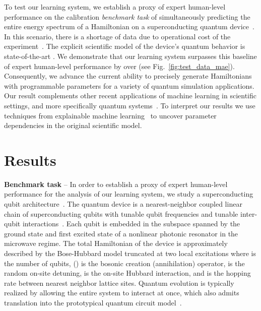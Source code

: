\documentclass[aps,twocolumn,superscriptaddress,floatfix,preprintnumbers,showkeys]{revtex4}
\begin{document}
To test our learning system, we establish a proxy of expert human-level performance on the calibration \textit{benchmark task} of simultaneously predicting the entire energy spectrum of a Hamiltonian on a superconducting quantum device~\cite{Chen_2014, Roushan_2017, Neill_2018, Chiaro_2019}. In this scenario, there is a shortage of data due to operational cost of the experiment~\cite{Roushan_2017}. The explicit scientific model of the device's quantum behavior is state-of-the-art \cite{Roushan_2017, Neill_2018, Chiaro_2019}. We demonstrate that our learning system surpasses this baseline of expert human-level performance by over  (see Fig.~\ref{fig:test_data_mae}). Consequently, we advance the current ability to precisely generate Hamiltonians with programmable parameters for a variety of quantum simulation applications. Our result complements other recent applications of machine learning in scientific settings, and more specifically quantum systems~\cite{Schmidt_2009, Zahedinejad_2016, Brunton_2016, Lin_2017, Biamonte_2017, Carrasquilla_2017, Koch-Janusz_2018, Torlai_2018, Butler_2018, Melnikov_2018, Dunjko_2018, Wu_2019, Giuseppe_2019, Mehta_2019, Iten_2020, Wetzel_2020, Udrescu_2020}. To interpret our results we use techniques from explainable machine learning~\cite{Lundberg_2017, Molnar_2020} to uncover parameter dependencies in the original scientific model.

\section*{Results}

\textbf{Benchmark task} -- In order to establish a proxy of expert human-level performance for the analysis of our learning system, we study a superconducting qubit architecture~\cite{Chen_2014}. The quantum device is a nearest-neighbor coupled linear chain of superconducting qubits with tunable qubit frequencies and tunable inter-qubit interactions~\cite{Chen_2014, Roushan_2017, Neill_2018, Chiaro_2019}. Each qubit is embedded in the subspace spanned by the ground state and first excited state of a nonlinear photonic resonator in the microwave regime. The total Hamiltonian of the device is approximately described by the Bose-Hubbard model truncated at two local excitations
 where  is the number of qubits,  () is the bosonic creation (annihilation) operator,  is the random on-site detuning,  is the on-site Hubbard interaction, and  is the hopping rate between nearest neighbor lattice sites. Quantum evolution is typically realized by allowing the entire system to interact at once, which also admits translation into the prototypical quantum circuit model~\cite{Neill_2018}. 
\end{document}
